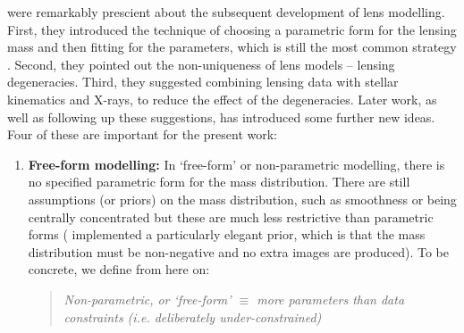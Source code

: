 \documentclass[galley,usenatbib]{mn2e}
\begin{document}
\cite{1981ApJ...244..736Y} were remarkably prescient about the
subsequent development of lens modelling.  First, they introduced the
technique of choosing a parametric form for the lensing mass and then
fitting for the parameters, which is still the most common strategy
\citep[see for example][]{2010GReGr..42.2151K,2011A&ARv..19...47K}.
Second, they pointed out the non-uniqueness of lens models -- lensing
degeneracies.  Third, they suggested combining lensing data with
stellar kinematics and X-rays, to reduce the effect of the
degeneracies.  Later work, as well as following up these suggestions,
has introduced some further new ideas.  Four of these are important for the present
work:
\begin{enumerate}
\item {\bf Free-form modelling:} In `free-form' or non-parametric modelling, there is no specified parametric form for
  the mass distribution.  There are still assumptions (or priors) on
  the mass distribution, such as smoothness or being centrally
  concentrated
  \citep{1997MNRAS.292..148S,2005MNRAS.360..477D,2009A&A...500..681M,2010ApJ...723.1678C}
  but these are much less restrictive than parametric forms (\cite{2006MNRAS.367.1209L} implemented a particularly elegant prior, which is that the mass distribution must be non-negative and no
  extra images are produced). To be concrete, we define from here on: 
  
  \begin{quote}
  {\it Non-parametric, or `free-form' $\equiv$ more parameters than data constraints (i.e. deliberately under-constrained)}
  \end{quote}
  

\end{enumerate}
\end{document}

